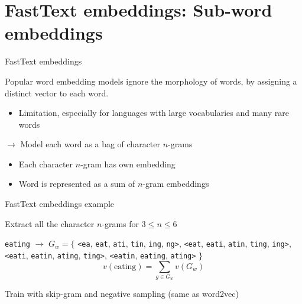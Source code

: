 \documentclass[12pt,aspectratio=169,handout]{beamer}
\begin{document}
\appendix

\section{FastText embeddings: Sub-word embeddings}

\begin{frame}{FastText embeddings}

Popular word embedding models ignore the morphology of words, by assigning a distinct vector to each word.
\begin{itemize}
\item Limitation, especially for languages with large vocabularies and many rare words
\end{itemize}

\pause

$\to$ Model each word as a bag of character $n$-grams
\begin{itemize}
\item Each character $n$-gram has own embedding
\item Word is represented as a sum of $n$-gram embeddings	
\end{itemize}



\end{frame}

\begin{frame}{FastText embeddings example}
	
Extract all the character $n$-grams for $3 \leq n \leq 6$

\begin{example}
\texttt{eating} $\to$ $G_w = \{$
\texttt{<ea}, \texttt{eat}, \texttt{ati}, \texttt{tin}, \texttt{ing}, \texttt{ng>},
\texttt{<eat}, \texttt{eati}, \texttt{atin}, \texttt{ting}, \texttt{ing>},
\texttt{<eati}, \texttt{eatin}, \texttt{ating}, \texttt{ting>},
\texttt{<eatin}, \texttt{eating}, \texttt{ating>} $\}$
$$
v(\text{eating}) = \sum_{g \in G_w} v(G_w)
$$
\end{example}

Train with skip-gram and negative sampling (same as word2vec)



\end{frame}
\end{document}
